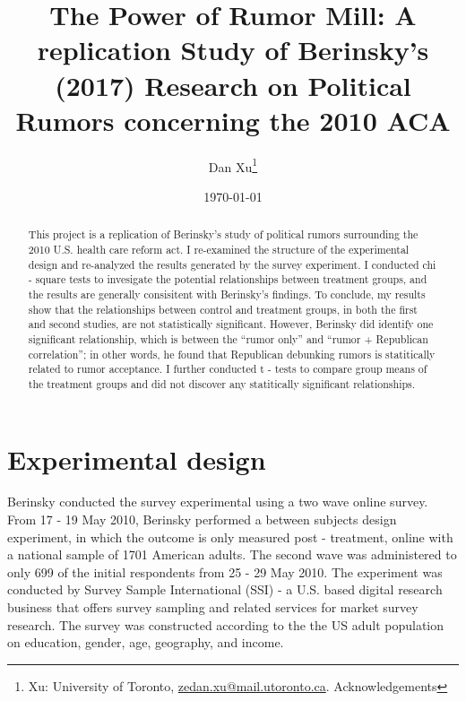 \documentclass[AER]{AEA}
\begin{document}
\title{The Power of Rumor Mill: A replication Study of Berinsky's (2017)
Research on Political Rumors concerning the 2010 ACA}


\author{
  Dan Xu\thanks{
  Xu: University of
Toronto, \href{mailto:zedan.xu@mail.utoronto.ca}{zedan.xu@mail.utoronto.ca}.
  Acknowledgements
}
}

\date{\today}

\begin{abstract}
This project is a replication of Berinsky's study of political rumors
surrounding the 2010 U.S. health care reform act. I re-examined the
structure of the experimental design and re-analyzed the results
generated by the survey experiment. I conducted chi - square tests to
invesigate the potential relationships between treatment groups, and the
results are generally consisitent with Berinsky's findings. To conclude,
my results show that the relationships between control and treatment
groups, in both the first and second studies, are not statistically
significant. However, Berinsky did identify one significant
relationship, which is between the ``rumor only'' and ``rumor +
Republican correlation''; in other words, he found that Republican
debunking rumors is statitically related to rumor acceptance. I further
conducted t - tests to compare group means of the treatment groups and
did not discover any statitically significant relationships.
\end{abstract}


\maketitle

\hypertarget{experimental-design}{%
\section{Experimental design}\label{experimental-design}}

Berinsky conducted the survey experimental using a two wave online
survey. From 17 - 19 May 2010, Berinsky performed a between subjects
design experiment, in which the outcome is only measured post -
treatment, online with a national sample of 1701 American adults. The
second wave was administered to only 699 of the initial respondents from
25 - 29 May 2010. The experiment was conducted by Survey Sample
International (SSI) - a U.S. based digital research business that offers
survey sampling and related services for market survey research. The
survey was constructed according to the the US adult population on
education, gender, age, geography, and income.
\end{document}
